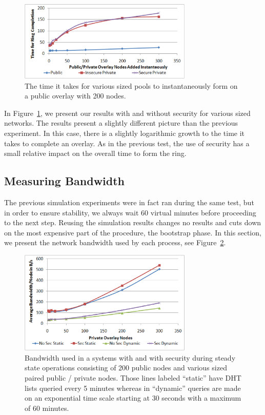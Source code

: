 \documentclass[conference]{IEEEtran}
\begin{document}
\begin{figure}[h]
\centering
\includegraphics[width=3.25in]{mass_join.eps}
\caption{The time it takes for various sized pools to instantaneously form
on a public overlay with 200 nodes.}
\label{fig:big_join}
\end{figure}

In Figure~\ref{fig:big_join}, we present our results with and without security
for various sized networks.  The results present a slightly different picture
than the previous experiment.  In this case, there is a slightly logarithmic
growth to the time it takes to complete an overlay.  As in the previous test,
the use of security has a small relative impact on the overall time to
form the ring.

\subsection{Measuring Bandwidth}
The previous simulation experiments were in fact ran during the same test, but
in order to ensure stability, we always wait 60 virtual minutes before proceeding
to the next step.  Reusing the simulation results changes no results and cuts
down on the most expensive part of the procedure, the bootstrap phase.  In this
section, we present the network bandwidth used by each process, see
Figure~\ref{fig:bandwidth}.

\begin{figure}[h]
\centering
\includegraphics[width=3.25in]{bandwidth.eps}
\caption{Bandwidth used in a systems with and with security during steady state
operations consisting of 200 public nodes and various sized paired public /
private nodes.  Those lines labeled ``static'' have DHT lists queried every 5
minutes whereas in ``dynamic'' queries are made on an exponential time scale
starting at 30 seconds with a maximum of 60 minutes.}
\label{fig:bandwidth}
\end{figure}
\end{document}
